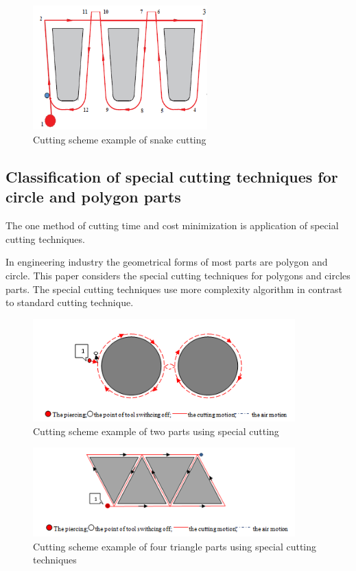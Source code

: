 \documentclass[runningheads]{llncs}
\begin{document}
\begin{figure}
  \begin{center}
  \includegraphics[width=0.6\textwidth]{snake.png}
  \caption{Cutting scheme example of snake cutting}
  \label{snake}
  \end{center}
\end{figure}

\subsection{Classification of special cutting techniques for circle and polygon parts}

The one method of cutting time and cost minimization is application of special cutting techniques.

In engineering industry the geometrical forms of most parts are polygon and circle.
This paper considers the special cutting techniques for polygons and circles parts.
The special cutting techniques use more complexity algorithm in contrast to standard cutting technique.

\begin{figure}
  \begin{center}
  \includegraphics[width=0.9\textwidth]{8.png}
  \caption{Cutting scheme example of two parts using special cutting}
  \label{8}
  \end{center}
\end{figure}

\begin{figure}
  \begin{center}
  \includegraphics[width=0.9\textwidth]{tri.png}
  \caption{Cutting scheme example of four triangle parts using special cutting techniques}
  \label{tri}
  \end{center}
\end{figure}
\end{document}
